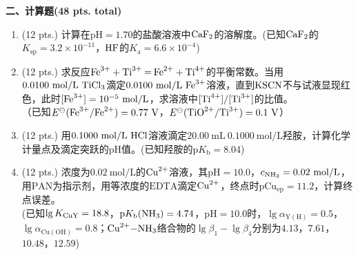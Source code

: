 \vspace{0.5cm}
\noindent\textbf{二、计算题(48 pts. total)}

\begin{enumerate}[label=\arabic*., itemsep=1.5ex]
    \item (12 pts.) 计算在$\mathrm{pH}=1.70$的盐酸溶液中$\ce{CaF2}$的溶解度。(已知$\ce{CaF2}$的$K_{\mathrm{sp}}=3.2\times10^{-11}$，$\ce{HF}$的$K_{\mathrm{a}}=6.6\times10^{-4}$)
    \item (12 pts.) 求反应$\ce{Fe^{3+} + Ti^{3+} = Fe^{2+} + Ti^{4+}}$的平衡常数。当用$0.0100\ \mathrm{mol/L}\ \ce{TiCl3}$滴定$0.0100\ \mathrm{mol/L}\ \ce{Fe^{3+}}$溶液，直到$\ce{KSCN}$不与试液显现红色，此时$[\ce{Fe^{3+}}]=10^{-5}\ \mathrm{mol/L}$，求溶液中$[\ce{Ti^{4+}}]/[\ce{Ti^{3+}}]$的比值。
    \\
    （已知$E^{\ominus}(\ce{Fe^{3+}/Fe^{2+}})=0.77\ \mathrm{V}$，$E^{\ominus}(\ce{TiO^{2+}/Ti^{3+}})=0.1\ \mathrm{V}$）
    \item (12 pts.) 用$0.1000\ \mathrm{mol/L}\ \ce{HCl}$溶液滴定$20.00\ \mathrm{mL}\ 0.1000\ \mathrm{mol/L}$羟胺，计算化学计量点及滴定突跃的$\mathrm{pH}$值。(已知羟胺的$\mathrm{p}K_{\mathrm{b}}=8.04$)
    \item (12 pts.) 浓度为$0.02\ \mathrm{mol/L}$的$\ce{Cu^{2+}}$溶液，其$\mathrm{pH}=10.0$，$c_{\ce{NH3}}=0.02\ \mathrm{mol/L}$，用$\mathrm{PAN}$为指示剂，用等浓度的$\mathrm{EDTA}$滴定$\ce{Cu^{2+}}$，终点时$\mathrm{pCu_{\mathrm{ep}}}=11.2$，计算终点误差。
    \\
    (已知$\lg K_{\ce{CuY}}=18.8$，$\mathrm{p}K_{\mathrm{b}}(\ce{NH3})=4.74$，$\mathrm{pH}=10.0$时，$\lg\alpha_{\mathrm{Y(H)}}=0.5$，$\lg\alpha_{\mathrm{Cu(OH)}}=0.8$；$\ce{Cu^{2+}-NH3}$络合物的$\lg\beta_1-\lg\beta_4$分别为$4.13$，$7.61$，$10.48$，$12.59$)
\end{enumerate}